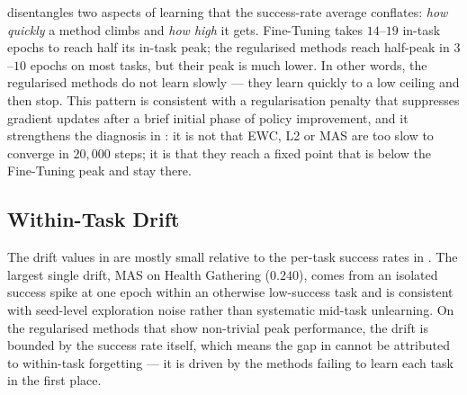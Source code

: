  disentangles two aspects of
learning that the success-rate average conflates: \emph{how
quickly} a method climbs and \emph{how high} it gets. Fine-Tuning
takes $14$--$19$ in-task epochs to reach half its in-task peak;
the regularised methods reach half-peak in $3$--$10$ epochs on
most tasks, but their peak is much lower. In other words, the
regularised methods do not learn slowly --- they learn quickly
to a low ceiling and then stop. This pattern is consistent with
a regularisation penalty that suppresses gradient updates after
a brief initial phase of policy improvement, and it strengthens
the diagnosis in : it is not that EWC, L2
or MAS are too slow to converge in $20{,}000$ steps; it is that
they reach a fixed point that is below the Fine-Tuning peak and
stay there.

\subsection{Within-Task Drift}

\begin{table}[t]
    \centering
    \caption{Within-task drift, defined as the peak training
        success during a task minus the mean success in the last
        five epochs of the same task. A small value means the
        agent ends the task close to where it peaked; a large
        positive value means the agent regressed within the task.
        Computed from the same logs as .}
    \label{tab:forgetting}
\end{table}

The drift values in  are mostly small
relative to the per-task success rates in .
The largest single drift, MAS on Health Gathering ($0.240$),
comes from an isolated success spike at one epoch within an
otherwise low-success task and is consistent with seed-level
exploration noise rather than systematic mid-task unlearning.
On the regularised methods that show non-trivial peak
performance, the drift is bounded by the success rate itself,
which means the gap in  cannot be attributed
to within-task forgetting --- it is driven by the methods
failing to learn each task in the first place.

